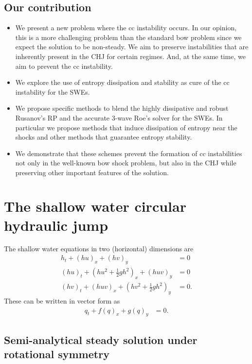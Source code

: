 \documentclass[preprint, 11pt]{article}
\begin{document}
\subsection{Our contribution}
\begin{itemize}
\item We present a new problem where the cc instability occurs. In our opinion, this is a more challenging 
  problem than the standard bow problem since we expect the solution to be non-steady. 
  We aim to preserve instabilities that are inherently present in the CHJ for certain regimes. And, 
  at the same time, we aim to prevent the cc instability. 
\item We explore the use of entropy dissipation and stability as cure of the cc instability for the SWEs. 
\item We propose specific methods to blend the highly dissipative and robust Rusanov's RP and the 
  accurate 3-wave Roe's solver for the SWEs. In particular we propose methods that induce dissipation of entropy
  near the shocks and other methods that guarantee entropy stability. 
\item We demonstrate that these schemes prevent the formation of cc instabilities not only 
  in the well-known bow shock problem, but also in the CHJ while preserving other important features of 
  the solution. 
\end{itemize}


\section{The shallow water circular hydraulic jump}
The shallow water equations in two (horizontal) dimensions are
\begin{subequations} \label{eq:sw}
\begin{align}
    h_t + (hu)_x + (hv)_y & = 0 \\
    (hu)_t + \left(hu^2 + \frac{1}{2}gh^2\right)_x + (huv)_y & = 0 \\
    (hv)_t + (huv)_x + \left(hv^2 + \frac{1}{2}gh^2\right)_y & = 0.
\end{align}
\end{subequations}
These can be written in vector form as
\begin{align}
    q_t + f(q)_x + g(q)_y & = 0.
\end{align}

\subsection{Semi-analytical steady solution under rotational symmetry}
\end{document}
